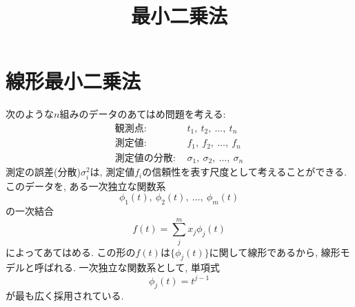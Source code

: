





\title{最小二乗法}
\maketitle

\section{線形最小二乗法}
次のような$n$組みのデータのあてはめ問題を考える:
\begin{align}
    \mathrm{観測点:}~ & t_{1},~ t_{2},~\ldots,~ t_{n}\\
    \mathrm{測定値:}~ & f_{1},~ f_{2},~\ldots,~ f_{n}\\
    \mathrm{測定値の分散:}~ & \sigma_{1},~ \sigma_{2},~\ldots,~ \sigma_{n}
\end{align}
測定の誤差(分散)$\sigma_{i}^{2}$は, 測定値$f_{i}$の信頼性を表す尺度として考えることができる. 
このデータを, ある一次独立な関数系
\begin{equation}
    \phi_{1}(t),~ \phi_{2}(t),~\ldots,~ \phi_{m}(t)
\end{equation}
の一次結合
\begin{equation}
    f(t) = \sum_{j}^{m} x_{j} \phi_{j}(t)
\end{equation}
によってあてはめる. 
この形の$f(t)$は$\{\phi_{j}(t)\}$に関して線形であるから, 線形モデルと呼ばれる. 
一次独立な関数系として, 単項式
\begin{equation}
    \phi_{j}(t) = t^{j-1}
\end{equation}
が最も広く採用されている. 

